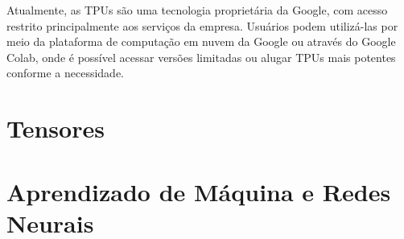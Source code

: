 \documentclass{report}
\begin{document}
Atualmente, as TPUs são uma tecnologia proprietária da Google, com acesso restrito principalmente aos serviços da empresa. Usuários podem utilizá-las por meio da plataforma de computação em nuvem da Google ou através do Google Colab, onde é possível acessar versões limitadas ou alugar TPUs mais potentes conforme a necessidade.

\section{Tensores}

\section{Aprendizado de Máquina e Redes Neurais}
\end{document}
